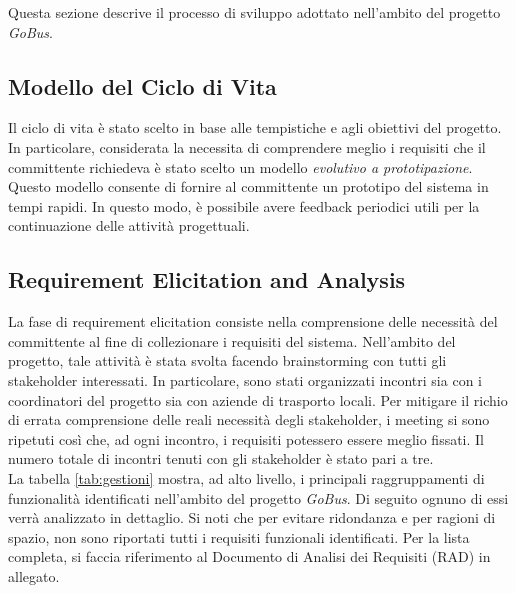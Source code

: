 Questa sezione descrive il processo di sviluppo adottato nell\rq ambito del progetto \emph{GoBus}.

\subsection{Modello del Ciclo di Vita}
Il ciclo di vita è stato scelto in base alle tempistiche e agli obiettivi del progetto. In particolare, considerata la necessita di comprendere meglio i requisiti che il committente richiedeva \`{e} stato scelto un modello \emph{evolutivo a prototipazione}. Questo modello consente di fornire al committente un prototipo del sistema in tempi rapidi. In questo modo, \`{e} possibile avere feedback periodici utili per la continuazione delle attivit\`{a} progettuali.

\subsection{Requirement Elicitation and Analysis}
La fase di requirement elicitation consiste nella comprensione delle necessit\`{a} del committente al fine di collezionare i requisiti del sistema. Nell\rq ambito del progetto, tale attivit\`{a} \`{e} stata svolta facendo brainstorming con tutti gli stakeholder interessati. In particolare, sono stati organizzati incontri sia con i coordinatori del progetto sia con aziende di trasporto locali. Per mitigare il richio di errata comprensione delle reali necessit\`{a} degli stakeholder, i meeting si sono ripetuti cos\`{i} che, ad ogni incontro, i requisiti potessero essere meglio fissati. Il numero totale di incontri tenuti con gli stakeholder \`{e} stato pari a tre.\\
La tabella \ref{tab:gestioni} mostra, ad alto livello, i principali raggruppamenti di funzionalità identificati nell'ambito del progetto \emph{GoBus}. Di seguito ognuno di essi verr\`{a} analizzato in dettaglio. Si noti che per evitare ridondanza e per ragioni di spazio, non sono riportati tutti i requisiti funzionali identificati. Per la lista completa, si faccia riferimento al Documento di Analisi dei Requisiti (RAD) in allegato.\\

